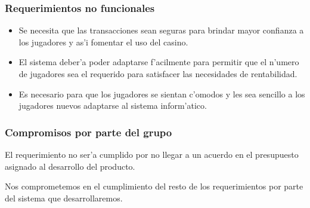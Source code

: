 \subsubsection{Requerimientos no funcionales}

\begin{itemize}

\item {} 

 Se necesita que las transacciones sean seguras para brindar mayor confianza a los jugadores y as'i fomentar el uso del casino.

\item {} 

 El sistema deber'a poder adaptarse f'acilmente para permitir que el n'umero de jugadores sea el requerido para satisfacer las necesidades de rentabilidad.

\item {} 

 Es necesario para que los jugadores se sientan c'omodos y les sea sencillo a los jugadores nuevos adaptarse al sistema inform'atico.

\end{itemize}


\subsubsection{Compromisos por parte del grupo}

El requerimiento  no ser'a cumplido por no llegar a un acuerdo en el presupuesto asignado al desarrollo del producto.

Nos comprometemos en el cumplimiento del resto de los requerimientos por parte del sistema que desarrollaremos.
